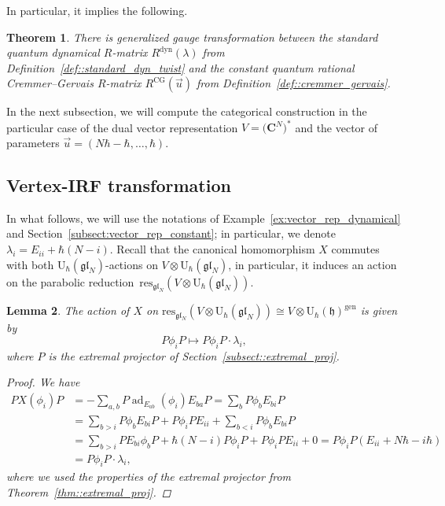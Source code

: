 \documentclass[pdftex]{sigma}
\numberwithin{equation}{section}
\newtheorem{Theorem}{Theorem}[section]
\newtheorem{Lemma}[Theorem]{Lemma}
\newcommand{\C}{\mathbf{C}}
\newcommand{\U}{\mathrm{U}_{\hbar}}
\newcommand{\h}{\mathfrak{h}}
\DeclareMathOperator{\ad}{ad}
\newcommand{\dyn}{\mathrm{dyn}}
\newcommand{\gen}{\mathrm{gen}}
\newcommand{\res}{\mathrm{res}}
\newcommand{\gl}{\mathfrak{gl}}
\begin{document}
	In particular, it implies the following.
	\begin{Theorem}
		\label{thm::the_vertex-irf}
		There is generalized gauge transformation between the standard quantum dynamical $R$-matrix $R^{\dyn}(\lambda)$ from Definition~{\rm\ref{def::standard_dyn_twist}} and the constant quantum rational Cremmer--Gervais $R$-matrix $R^{\mathrm{CG}}(\vec{u})$ from Definition~{\rm\ref{def::cremmer_gervais}}.
	\end{Theorem}
	
	In the next subsection, we will compute the categorical construction in the particular case of the dual vector representation $V = \bigl(\C^N\bigr)^*$ and the vector of parameters $\vec{u} = (N\hbar - \hbar,\dots,\hbar)$.
	
	\subsection{Vertex-IRF transformation}
	
	In what follows, we will use the notations of Example~\ref{ex:vector_rep_dynamical} and Section~\ref{subsect:vector_rep_constant}; in particular, we denote $\lambda_i = E_{ii} + \hbar(N-i)$. Recall that the canonical homomorphism $X$ commutes with both $\U(\gl_N)$-actions on $V \otimes \U(\gl_N)$, in particular, it induces an action on the parabolic reduction~$\res_{\gl_N}(V \otimes \U(\gl_N))$.
	
	\begin{Lemma}
		\label{lm:canonical_homomorphism_parabolic}
		The action of $X$ on $\res_{\gl_N}(V \otimes \U(\gl_N)) \cong V \otimes \U(\h)^{\gen}$ is given by
		\[
		P \phi_i P \mapsto P\phi_i P \cdot \lambda_i,
		\]
		where $P$ is the extremal projector of Section~{\rm\ref{subsect::extremal_proj}}.
		\begin{proof}
			We have
			\begin{align*}
				PX(\phi_i)P &= -\sum\limits_{a,b} P \ad_{E_{ab}}(\phi_i) E_{ba} P = \sum\limits_b P \phi_b E_{bi} P \\
&= \sum\limits_{b>i} P \phi_b E_{bi} P + P\phi_i P E_{ii} + \sum\limits_{b<i} P \phi_b E_{bi} P \\
				&= \sum\limits_{b>i} P E_{bi} \phi_b P +\hbar (N-i) P\phi_i P + P\phi_i P E_{ii} + 0 = P \phi_i P (E_{ii}+N\hbar - i\hbar) \\
				&= P\phi_i P \cdot \lambda_i,
			\end{align*}
			where we used the properties of the extremal projector from Theorem~\ref{thm::extremal_proj}.
		\end{proof}
	\end{Lemma}
	
\end{document}
